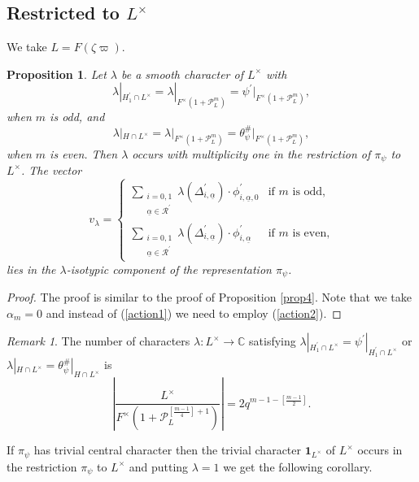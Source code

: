 \documentclass[12pt]{amsart}
\newtheorem{proposition}[theorem]{Proposition}
\theoremstyle{definition}
\theoremstyle{remark}
\newtheorem{remark}{Remark}
\begin{document}
\subsection{Restricted to $L^\times$}

We take $L = F(\zeta \varpi)$. 

\begin{proposition}\label{prop5}
Let $\lambda$ be a smooth character of $L^\times$ with 
\[\lambda|_{H_1^\prime \cap L^\times} =  \lambda|_{F^\times (1+\mathcal P_L^m)}  =  \psi^\prime|_{F^\times (1+\mathcal P_L^m)},\]
when $m$ is odd, and 
\[\lambda|_{H \cap L^\times} = \lambda|_{F^\times (1 +\mathcal P_L^m)} =  \theta_\psi^\#|_{F^\times (1 + \mathcal P_L^m)},\]
when $m$ is even. Then $\lambda$ occurs with multiplicity one in the restriction of $\pi_\psi$ to $L^\times$. The vector 
\[v_\lambda = \begin{cases}
\sum\limits_{\substack{i=0,1 \\  \underline{\alpha} \in \mathcal{R}^\prime }} \lambda(\Delta_{i,\underline{\alpha}}^\prime) \cdot  \phi^\prime_{i,\underline{\alpha}, 0}  &\text{if $m$ is odd,} \\
\sum\limits_{\substack{i=0,1 \\  \underline{\alpha} \in \mathcal{R}^\prime  }} \lambda(\Delta_{i,\underline{\alpha}}^\prime) \cdot  \phi_{i,\underline{\alpha}}^\prime  &\text{if $m$ is even,}
\end{cases}\]
lies in the $\lambda$-isotypic component of the representation $\pi_\psi$.
\end{proposition}

\begin{proof}
The proof is similar to the proof of Proposition \ref{prop4}. Note that we take $\alpha_m = 0$ and instead of (\ref{action1}) we need to employ (\ref{action2}).	
\end{proof}	

\begin{remark}\label{rmk5}
 The number of characters $\lambda: L^\times \rightarrow \mathbb C$ satisfying $\lambda|_{H_1^\prime \cap L^\times} = \psi^\prime |_{H_1^\prime \cap L^\times}$ or $\lambda |_{H \cap L^\times} = \theta_\psi^\# |_{H \cap L^\times}$ is 
 \[\left| \frac{L^\times}{F^\times (1 + \mathcal P_L^{\left[\frac{m-1}{4} \right] +1} )}   \right| = 2q^{m-1-\left[\frac{m-1}{2} \right]}.\]
\end{remark}

If $\pi_\psi$ has trivial central character then the trivial character $\textbf{1}_{L^\times}$ of $L^\times$ occurs in the restriction $\pi_\psi$ to $L^\times$ and putting $\lambda =1$ we get the following corollary.
\end{document}
